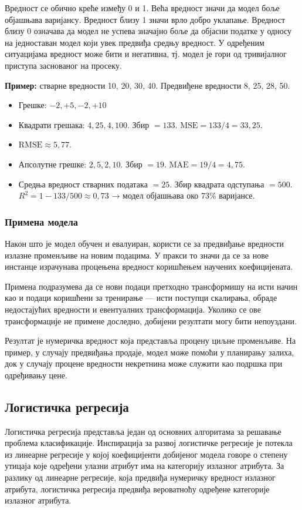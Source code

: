 Вредност се обично креће између 0 и 1. Већа вредност значи да модел боље објашњава варијансу. Вредност близу 1 значи врло добро уклапање. Вредност близу 0 означава да модел не успева значајно боље да објасни податке у односу на једноставан модел који увек предвиђа средњу вредност. У одређеним ситуацијама вредност може бити и негативна, тј. модел је гори од тривијалног приступа заснованог на просеку.

\textbf{Пример:} стварне вредности 10, 20, 30, 40. Предвиђене вредности 8, 25, 28, 50.

\begin{itemize}
  \item Грешке: $-2, +5, -2, +10$
  \item Квадрати грешака: $4, 25, 4, 100$. Збир $= 133$. $\mathrm{MSE} = 133 / 4 = 33{,}25$.
  \item $\mathrm{RMSE} \approx 5{,}77$.
  \item Апсолутне грешке: $2, 5, 2, 10$. Збир $= 19$. $\mathrm{MAE} = 19 / 4 = 4{,}75$.
  \item Средња вредност стварних података $= 25$. Збир квадрата одступања $= 500$. $R^2 = 1 - 133/500 \approx 0{,}73$ → модел објашњава око 73\% варијансе.
\end{itemize}

\subsubsection{Примена модела}
Након што је модел обучен и евалуиран, користи се за предвиђање вредности излазне променљиве на новим подацима. У пракси то значи да се за нове инстанце израчунава процењена вредност коришћењем научених коефицијената.

Примена подразумева да се нови подаци претходно трансформишу на исти начин као и подаци коришћени за тренирање — исти поступци скалирања, обраде недостајућих вредности и евентуалних трансформација. Уколико се ове трансформације не примене доследно, добијени резултати могу бити непоуздани.

Резултат је нумеричка вредност која представља процену циљне променљиве. На пример, у случају предвиђања продаје, модел може помоћи у планирању залиха, док у случају процене вредности некретнина може служити као подршка при одређивању цене.

\subsection{Логистичка регресија}
Логистичка регресија представља један од основних алгоритама за решавање проблема класификације. Инспирација за развој логистичке регресије је потекла из линеарне регресије у којој коефицијенти добијеног модела говоре о степену утицаја које одређени улазни атрибут има на категорију излазног атрибута. За разлику од линеарне регресије, која предвиђа нумеричку вредност излазног атрибута, логистичка регресија предвиђа вероватноћу одређене категорије излазног атрибута.

